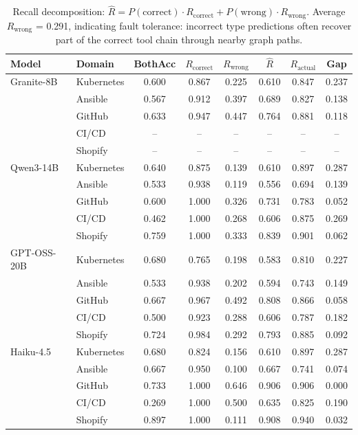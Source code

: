 \begin{table}[t]
\centering
\small
\begin{tabular}{ll cccc cc}
\toprule
\textbf{Model} & \textbf{Domain} & BothAcc & $R_{\text{correct}}$ & $R_{\text{wrong}}$ & $\hat{R}$ & $R_{\text{actual}}$ & Gap \\
\midrule
Granite-8B & Kubernetes & 0.600 & 0.867 & 0.225 & 0.610 & 0.847 & 0.237 \\
 & Ansible & 0.567 & 0.912 & 0.397 & 0.689 & 0.827 & 0.138 \\
 & GitHub & 0.633 & 0.947 & 0.447 & 0.764 & 0.881 & 0.118 \\
 & CI/CD & -- & -- & -- & -- & -- & -- \\
 & Shopify & -- & -- & -- & -- & -- & -- \\
\midrule
Qwen3-14B & Kubernetes & 0.640 & 0.875 & 0.139 & 0.610 & 0.897 & 0.287 \\
 & Ansible & 0.533 & 0.938 & 0.119 & 0.556 & 0.694 & 0.139 \\
 & GitHub & 0.600 & 1.000 & 0.326 & 0.731 & 0.783 & 0.052 \\
 & CI/CD & 0.462 & 1.000 & 0.268 & 0.606 & 0.875 & 0.269 \\
 & Shopify & 0.759 & 1.000 & 0.333 & 0.839 & 0.901 & 0.062 \\
\midrule
GPT-OSS-20B & Kubernetes & 0.680 & 0.765 & 0.198 & 0.583 & 0.810 & 0.227 \\
 & Ansible & 0.533 & 0.938 & 0.202 & 0.594 & 0.743 & 0.149 \\
 & GitHub & 0.667 & 0.967 & 0.492 & 0.808 & 0.866 & 0.058 \\
 & CI/CD & 0.500 & 0.923 & 0.288 & 0.606 & 0.787 & 0.182 \\
 & Shopify & 0.724 & 0.984 & 0.292 & 0.793 & 0.885 & 0.092 \\
\midrule
Haiku-4.5 & Kubernetes & 0.680 & 0.824 & 0.156 & 0.610 & 0.897 & 0.287 \\
 & Ansible & 0.667 & 0.950 & 0.100 & 0.667 & 0.741 & 0.074 \\
 & GitHub & 0.733 & 1.000 & 0.646 & 0.906 & 0.906 & 0.000 \\
 & CI/CD & 0.269 & 1.000 & 0.500 & 0.635 & 0.825 & 0.190 \\
 & Shopify & 0.897 & 1.000 & 0.111 & 0.908 & 0.940 & 0.032 \\
\bottomrule
\end{tabular}
\caption{Recall decomposition: $\hat{R} = P(\text{correct}) \cdot R_{\text{correct}} + P(\text{wrong}) \cdot R_{\text{wrong}}$. Average $R_{\text{wrong}}$ = 0.291, indicating fault tolerance: incorrect type predictions often recover part of the correct tool chain through nearby graph paths.}
\label{tab:recall-decomposition}
\end{table}